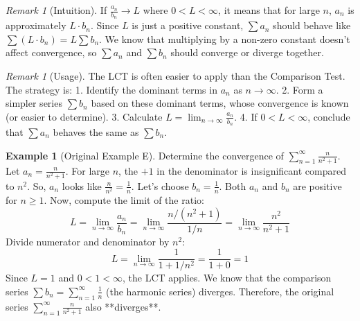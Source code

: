 \documentclass[11pt]{article}
\theoremstyle{plain}
\theoremstyle{definition}
\newtheorem{example}[theorem]{Example}
\theoremstyle{remark}
\newtheorem{remark}[theorem]{Remark}
\theoremstyle{adminstyle}
\begin{document}
\begin{remark}[Intuition]
If $\frac{a_n}{b_n} \to L$ where $0 < L < \infty$, it means that for large $n$, $a_n$ is approximately $L \cdot b_n$. Since $L$ is just a positive constant, $\sum a_n$ should behave like $\sum (L \cdot b_n) = L \sum b_n$. We know that multiplying by a non-zero constant doesn't affect convergence, so $\sum a_n$ and $\sum b_n$ should converge or diverge together.
\end{remark}

\begin{remark}[Usage]
The LCT is often easier to apply than the Comparison Test. The strategy is:
1. Identify the dominant terms in $a_n$ as $n \to \infty$.
2. Form a simpler series $\sum b_n$ based on these dominant terms, whose convergence is known (or easier to determine).
3. Calculate $L = \lim_{n\to\infty} \frac{a_n}{b_n}$.
4. If $0 < L < \infty$, conclude that $\sum a_n$ behaves the same as $\sum b_n$.
\end{remark}

\begin{example}[Original Example E] \label{ex:n_over_n2_plus_1}
Determine the convergence of $\sum_{n=1}^{\infty} \frac{n}{n^2 + 1}$.
Let $a_n = \frac{n}{n^2 + 1}$. For large $n$, the $+1$ in the denominator is insignificant compared to $n^2$. So, $a_n$ looks like $\frac{n}{n^2} = \frac{1}{n}$.
Let's choose $b_n = \frac{1}{n}$. Both $a_n$ and $b_n$ are positive for $n \ge 1$.
Now, compute the limit of the ratio:
\[ L = \lim_{n\to\infty} \frac{a_n}{b_n} = \lim_{n\to\infty} \frac{n/(n^2 + 1)}{1/n} = \lim_{n\to\infty} \frac{n^2}{n^2 + 1} \]
Divide numerator and denominator by $n^2$:
\[ L = \lim_{n\to\infty} \frac{1}{1 + 1/n^2} = \frac{1}{1 + 0} = 1 \]
Since $L=1$ and $0 < 1 < \infty$, the LCT applies.
We know that the comparison series $\sum b_n = \sum_{n=1}^{\infty} \frac{1}{n}$ (the harmonic series) diverges.
Therefore, the original series $\sum_{n=1}^{\infty} \frac{n}{n^2 + 1}$ also **diverges**.
\end{example}
\end{document}
